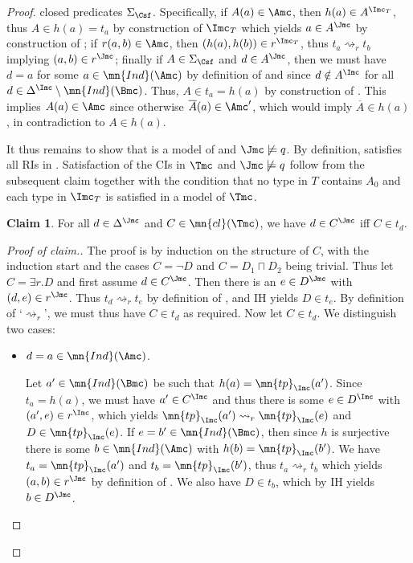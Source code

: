 \documentclass{lmcs}
\theoremstyle{definition}
\newtheorem*{claim*}{Claim}
\let\OriginalQedSymbol\qedsymbol
\renewcommand{\qedsymbol}{\OriginalQedSymbol\setcounter{claim}{0}}
\let\NormalQedSymbol\qedsymbol
\newenvironment{clmproof}[1]{\renewcommand{\qedsymbol}{$\dashv$}\begin{proof}[Proof of claim.]\space#1}{\end{proof}\renewcommand{\qedsymbol}{\NormalQedSymbol}}
\begin{document}
\begin{proof}
  closed predicates $\Sigma_{\Csf}$. Specifically, if $A(a) \in \Amc$,
  then $h(a) \in A^{\Imc_T}$, thus $A \in h(a) =t_a$ by construction
  of $\Imc_T$ which yields $a \in A^\Jmc$ by construction of \Jmc; if
  $r(a,b) \in \Amc$, then $(h(a),h(b)) \in r^{\Imc_T}$, thus $t_a
  \rightsquigarrow_r t_b$ implying $(a,b) \in r^\Jmc$; finally if $A
  \in \Sigma_{\Csf}$ and $d \in A^\Jmc$, then we must have $d=a$ for
  some $a \in \mn{Ind}(\Amc)$ by definition of \Jmc and since $d
  \notin A^\Imc$ for all $d \in \Delta^\Imc \setminus \mn{Ind}(\Bmc)$.
  Thus, $A \in t_a=h(a)$ by construction of \Jmc. This implies $A(a)
  \in \Amc$ since otherwise $\overline{A}(a) \in \Amc'$, which would
  imply $\overline{A} \in h(a)$, in contradiction to $A \in h(a)$.

  \smallskip
  
  It thus remains to show that \Jmc is a model of \Tmc and $\Jmc \not
  \models q$. By definition, \Jmc satisfies all RIs in
  \Tmc. Satisfaction of the CIs in $\Tmc$ and $\Jmc \not
  \models q$ follow from the subsequent claim together with the condition that no type in $T$ contains $A_{0}$ and each type in $\Imc_T$ is satisfied in a model of $\Tmc$.
  \begin{claim*}
    For all $d \in \Delta^\Jmc$ and $C \in \mn{cl}(\Tmc)$, we have $d 
    \in C^\Jmc$ iff $C \in t_d$.
  \end{claim*}
  \begin{clmproof}
  The proof is by induction on the structure of $C$, with the
  induction start and the cases $C= \neg D$ and $C = D_1 \sqcap D_2$
  being trivial.  Thus let $C = \exists r . D$ and first assume $d \in
  C^\Jmc$.  Then there is an $e \in D^\Jmc$ with $(d,e) \in
  r^\Jmc$. Thus $t_d \rightsquigarrow_r t_e$ by definition of \Jmc,
  and IH yields $D \in t_e$. By definition of `$\rightsquigarrow_r$',
  we must thus have $C \in t_d$ as required.  Now let $C \in t_d$. We
  distinguish two cases:
  \begin{itemize}

  \item $d=a \in \mn{Ind}(\Amc)$.

    Let $a' \in \mn{Ind}(\Bmc)$ be such that
    $h(a)=\mn{tp}_\Imc(a')$. Since $t_a=h(a)$, we must have $a' \in
    C^\Imc$ and thus there is some $e \in D^\Imc$ with $(a',e) \in
    r^\Imc$, which yields $\mn{tp}_\Imc(a') \rightsquigarrow_r
    \mn{tp}_\Imc(e)$ and $D \in \mn{tp}_\Imc(e)$. If $e=b' \in
    \mn{Ind}(\Bmc)$, then since $h$ is surjective there is some $b \in
    \mn{Ind}(\Amc)$ with $h(b)=\mn{tp}_\Imc(b')$. We have
    $t_a=\mn{tp}_\Imc(a')$ and $t_b=\mn{tp}_\Imc(b')$, thus $t_a
    \rightsquigarrow_r t_b$ which yields $(a,b) \in r^\Jmc$ by
    definition of \Jmc. We also have $D \in t_b$, which by IH yields
    $b \in D^\Jmc$.


\end{itemize}
\end{clmproof}
\end{proof}
\end{document}
